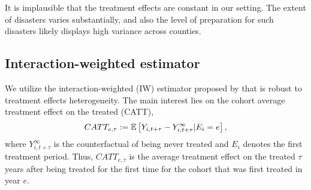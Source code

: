 It is implausible that the treatment effects are constant in our setting. The extent of disasters varies substantially, and also the level of preparation for such disasters likely displays high variance across counties. 

\subsection{Interaction-weighted estimator}

We utilize the interaction-weighted (IW) estimator proposed by \cite{Sun_2021} that is robust to treatment effects heterogeneity. The main interest lies on the cohort average treatment effect on the treated (CATT),
\begin{align*}
	CATT_{e, \tau} := \mathbb{E} \left[ Y_{i, t+\tau} - Y_{i, t+\tau}^{\infty} | E_i = e \right],
\end{align*}
where $Y_{i, t+\tau}^{\infty}$ is the counterfactual of being never treated and $E_i$ denotes the first treatment period. Thus, $CATT_{e, \tau}$ is the average treatment effect on the treated $\tau$ years after being treated for the first time for the cohort that was first treated in year $e$.

